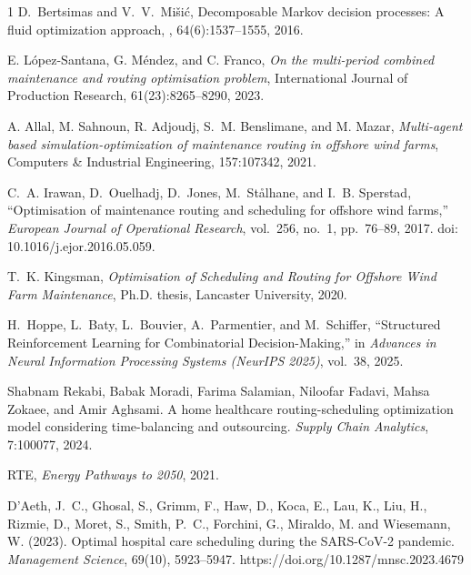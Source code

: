 \documentclass{article}
\begin{document}

\begin{thebibliography}{1}
D.~Bertsimas and V.~V.~Mi\v{s}i\'c,
\newblock Decomposable {M}arkov decision processes: A fluid optimization
  approach,
, 64(6):1537--1555, 2016.

 E. López-Santana, G. Méndez, and C. Franco,
\emph{On the multi-period combined maintenance and routing optimisation problem},
International Journal of Production Research, 61(23):8265--8290, 2023.

 A. Allal, M. Sahnoun, R. Adjoudj, S.~M. Benslimane, and M. Mazar,
\emph{Multi-agent based simulation-optimization of maintenance routing in offshore wind farms},
Computers \& Industrial Engineering, 157:107342, 2021.

C.~A. Irawan, D.~Ouelhadj, D.~Jones, M.~Stålhane, and I.~B. Sperstad,
``Optimisation of maintenance routing and scheduling for offshore wind farms,''
\emph{European Journal of Operational Research},
vol.~256, no.~1, pp.~76--89, 2017.
doi: 10.1016/j.ejor.2016.05.059.

T.~K. Kingsman, \emph{Optimisation of Scheduling and Routing for Offshore Wind Farm Maintenance}, Ph.D. thesis, Lancaster University, 2020.


H.~Hoppe, L.~Baty, L.~Bouvier, A.~Parmentier, and M.~Schiffer,
``Structured Reinforcement Learning for Combinatorial Decision-Making,''
in \emph{Advances in Neural Information Processing Systems (NeurIPS 2025)},
vol.~38, 2025.

Shabnam Rekabi, Babak Moradi, Farima Salamian, Niloofar Fadavi, Mahsa Zokaee, and Amir Aghsami.
\newblock A home healthcare routing-scheduling optimization model considering time-balancing and outsourcing.
\newblock \emph{Supply Chain Analytics}, 7:100077, 2024.

 RTE, \emph{Energy Pathways to 2050}, 2021.

D'Aeth, J.~C., Ghosal, S., Grimm, F., Haw, D., Koca, E., Lau, K., Liu, H.,
Rizmie, D., Moret, S., Smith, P.~C., Forchini, G., Miraldo, M. and Wiesemann, W. (2023).
Optimal hospital care scheduling during the SARS-CoV-2 pandemic.
\textit{Management Science}, 69(10), 5923--5947.
https://doi.org/10.1287/mnsc.2023.4679


\end{thebibliography}
\end{document}
